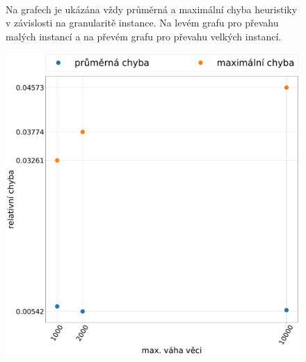 \documentclass[11pt]{article}
\begin{document}
\begin{figure}
\begin{minipage}[c]{0.49\textwidth}
    \end{minipage}
    \\
   \caption{Na grafech je ukázána vždy průměrná a maximální chyba heuristiky v závislosti na granularitě instance. Na levém grafu pro převahu malých instancí a na převém grafu pro převahu velkých instancí.}\label{fig:GOEI}
    \end{figure} 
        
    
\begin{figure}
	\centering
    \begin{minipage}[c]{0.49\textwidth}
        \centering\includegraphics[width=\textwidth]{img/WHE.pdf} 
    \end{minipage}
    \begin{minipage}[c]{0.49\textwidth}

\end{minipage}
\end{figure}
\end{document}
